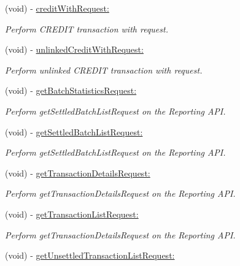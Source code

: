 \begin{DoxyCompactItemize}
(void) -\/ \hyperlink{interface_auth_net_a95bc4a5faa7ce40df5295837b98617b3}{creditWithRequest:}
\begin{DoxyCompactList}\small\item\em Perform CREDIT transaction with request. \item\end{DoxyCompactList}\item 
(void) -\/ \hyperlink{interface_auth_net_a5b2bc486ff67a6f7fd8c8708c89057a0}{unlinkedCreditWithRequest:}
\begin{DoxyCompactList}\small\item\em Perform unlinked CREDIT transaction with request. \item\end{DoxyCompactList}\item 
(void) -\/ \hyperlink{interface_auth_net_a46d75652309982e05c800901ac86e5eb}{getBatchStatisticsRequest:}
\begin{DoxyCompactList}\small\item\em Perform getSettledBatchListRequest on the Reporting API. \item\end{DoxyCompactList}\item 
(void) -\/ \hyperlink{interface_auth_net_a1fa89b0779cc561949082cb567dba157}{getSettledBatchListRequest:}
\begin{DoxyCompactList}\small\item\em Perform getSettledBatchListRequest on the Reporting API. \item\end{DoxyCompactList}\item 
(void) -\/ \hyperlink{interface_auth_net_aceb44273bc91643ae24b3197fe41f5a1}{getTransactionDetailsRequest:}
\begin{DoxyCompactList}\small\item\em Perform getTransactionDetailsRequest on the Reporting API. \item\end{DoxyCompactList}\item 
(void) -\/ \hyperlink{interface_auth_net_aea170727593689d07fd6a522523bf222}{getTransactionListRequest:}
\begin{DoxyCompactList}\small\item\em Perform getTransactionDetailsRequest on the Reporting API. \item\end{DoxyCompactList}\item 
(void) -\/ \hyperlink{interface_auth_net_aa5bdf2aed5018970a50ee6e3184a6bf8}{getUnsettledTransactionListRequest:}

\end{DoxyCompactItemize}

